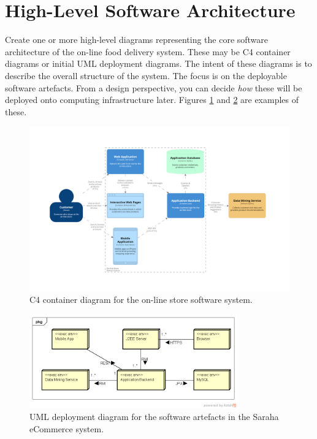 \documentclass{csse4400}
\begin{document}
\newpage
\section{High-Level Software Architecture}
Create one or more high-level diagrams representing the core software architecture of the on-line food delivery system.
These may be C4 container diagrams or initial UML deployment diagrams.
The intent of these diagrams is to describe the overall structure of the system.
The focus is on the deployable software artefacts.
From a design perspective, you can decide \emph{how} these will be deployed onto computing infrastructure later.
Figures \ref{fig:c4_container_store} and \ref{fig:uml_deployment_software} are examples of these.

\begin{figure}[h!]
    \centering
    \begin{adjustwidth}{-5mm}{-5mm}
        \includegraphics[trim=250 226 286 258,clip,width=0.92\paperwidth]{../../notes/views/images/c4/store_container_diagram.png}
    \end{adjustwidth}
    \caption{C4 container diagram for the on-line store software system.}
    \label{fig:c4_container_store}
\end{figure}

\begin{figure}[h!]
    \centering
    \includegraphics[trim=38 56 18 43,clip,width=0.8\textwidth]{images/software-deployment.png}
    \caption{UML deployment diagram for the software artefacts in the Saraha eCommerce system.}
    \label{fig:uml_deployment_software}
\end{figure}
\end{document}
